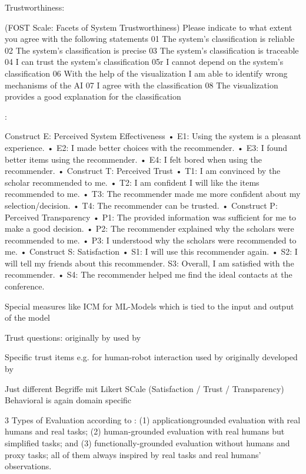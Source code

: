 Trustworthiness: \cite{schrills_color_2020}

(FOST Scale: Facets of System Trustworthiness)
Please indicate to what extent you agree with the following statements 01 The system’s classification is reliable 02 The system’s classification is precise 03 The system’s classification is traceable 04 I can trust the system’s classification 05r I cannot depend on the system’s classification 06 With the help of the visualization I am able to identify wrong mechanisms of the AI 07 I agree with the classification 08 The visualization provides a good explanation for the classification


\cite{tsai_effects_2020}:

Construct E: Perceived System Effectiveness • E1: Using the system is a pleasant experience. • E2: I made better choices with the recommender. • E3: I found better items using the recommender. • E4: I felt bored when using the recommender. • Construct T: Perceived Trust • T1: I am convinced by the scholar recommended to me. • T2: I am confident I will like the items recommended to me. • T3: The recommender made me more confident about my selection/decision. • T4: The recommender can be trusted. • Construct P: Perceived Transparency • P1: The provided information was sufficient for me to make a good decision. • P2: The recommender explained why the scholars were recommended to me. • P3: I understood why the scholars were recommended to me. • Construct S: Satisfaction • S1: I will use this recommender again. • S2: I will tell my friends about this recommender. S3: Overall, I am satisfied with the recommender. • S4: The recommender helped me find the ideal contacts at the conference.

Special measures like ICM for ML-Models which is tied to the input and output of the model \cite{waa_evaluating_2021, neerincx_using_2018}

Trust questions: originally by \cite{mayer1999effect} used by \cite{wang_is_2018}

Specific trust items e.g. for human-robot interaction used by \cite{zhu_effects_2020} originally developed by \cite{schaefer2013perception}

Just different Begriffe mit Likert SCale (Satisfaction / Trust / Transparency) \cite{koo_understanding_2016, koo_why_2015} Behavioral is again domain specific

3 Types of Evaluation according to \cite{ribera2019can, doshi2017towards}: (1) applicationgrounded evaluation with real humans and real tasks; (2) human-grounded evaluation with real humans but simplified tasks; and (3) functionally-grounded evaluation without humans and proxy tasks; all of them always inspired by real tasks and real humans’ observations.

